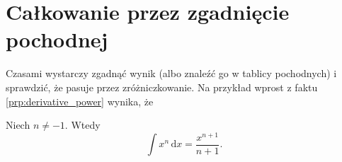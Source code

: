 %

\section{Całkowanie przez zgadnięcie pochodnej}

Czasami wystarczy zgadnąć wynik (albo znaleźć go w tablicy pochodnych) i sprawdzić, że pasuje przez zróżniczkowanie.
Na przykład wprost z faktu \ref{prp:derivative_power} wynika, że
\begin{problem}
    Niech $n \neq -1$.
    Wtedy
    \begin{equation}
        \int x^n \,\mathrm{d}x = \frac{x^{n+1}}{n+1}.
    \end{equation}
\end{problem}

%